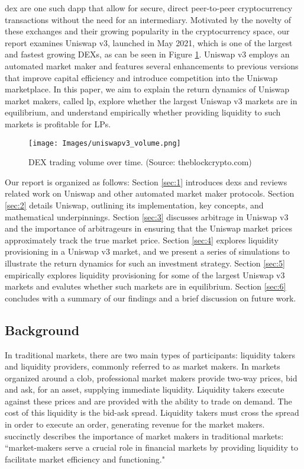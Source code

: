 \documentclass[11pt]{article}
\begin{document}
\gls{dex} are one such \gls{dapp} that allow for secure, direct peer-to-peer cryptocurrency transactions without the need for an intermediary. Motivated by the novelty of these exchanges and their growing popularity in the cryptocurrency space, our report examines Uniswap v3, launched in May 2021, which is one of the largest and fastest growing DEXs, as can be seen in Figure \ref{fig:dex_trading_vol}. Uniswap v3 employs an automated market maker and features several enhancements to previous versions that improve capital efficiency and introduce competition into the Uniswap marketplace. In this paper, we aim to explain the return dynamics of Uniswap market makers, called \gls{lp}, explore whether the largest Uniswap v3 markets are in equilibrium, and understand empirically whether providing liquidity to such markets is profitable for LPs.

\begin{figure}[H]
    \centering
    \texttt{[image: Images/uniswapv3\_volume.png]}
    \caption{DEX trading volume over time. (Source: theblockcrypto.com)}
    \label{fig:dex_trading_vol}
\end{figure}

Our report is organized as follows: Section \ref{sec:1} introduces \glspl{dex} and reviews related work on Uniswap and other automated market maker protocols. Section \ref{sec:2} details Uniswap, outlining its implementation, key concepts, and mathematical underpinnings. Section \ref{sec:3} discusses arbitrage in Uniswap v3 and the importance of arbitrageurs in ensuring that the Uniswap market prices approximately track the true market price. Section  \ref{sec:4} explores liquidity provisioning in a Uniswap v3 market, and we present a series of simulations to illustrate the return dynamics for such an investment strategy. Section \ref{sec:5} empirically explores liquidity provisioning for some of the largest Uniswap v3 markets and evalutes whether such markets are in equilibrium. Section  \ref{sec:6} concludes with a summary of our findings and a brief discussion on future work. %

\subsection{Background}

In traditional markets, there are two main types of participants: liquidity takers and liquidity providers, commonly referred to as market makers. In markets organized around a \gls{clob}, professional market makers provide two-way prices, bid and ask, for an asset, supplying immediate liquidity. Liquidity takers execute against these prices and are provided with the ability to trade on demand. The cost of this liquidity is the bid-ask spread. Liquidity takers must cross the spread in order to execute an order, generating revenue for the market makers. \citet{BankInternationalSettlements} succinctly describes the importance of market makers in traditional markets: ``market-makers serve a crucial role in financial markets by providing liquidity to facilitate market efficiency and functioning."
\end{document}
